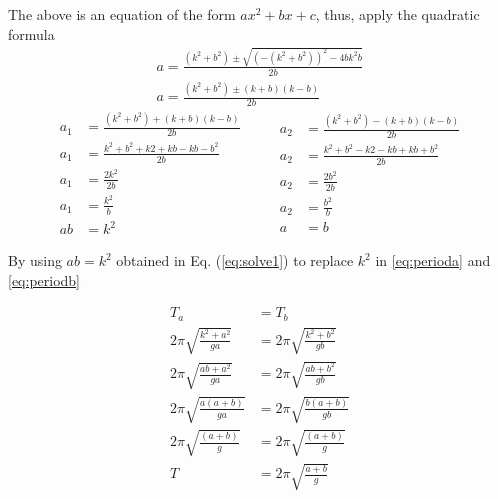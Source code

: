 \documentclass[12pt]{article}
\begin{document}
The above is an equation of the form $ax^2+bx+c$, thus, apply the quadratic formula
\begin{gather*}
    a= \frac{\left(k^2+b^2\right)\pm \sqrt{\left(-\left(k^2+b^2\right)\right)^2-4bk^2b}}{2b}\\
    a= \frac{\left(k^2+b^2\right)\pm \left(k+b\right)\left(k-b\right)}{ 2b }
\end{gather*}
\begin{equation}
    \begin{split}
        a_1 &= \frac{ (k^2+b^2)+ (k+b)(k-b) }{2b}\\
        a_1 &= \frac{ k^2+b^2+k2+kb-kb-b^2 }{2b} \\
        a_1 &= \frac{2k^2}{2b}\\
        a_1 &= \frac{k^2}{b}\\
        ab &= k^2 \label{eq:solve1} 
    \end{split}
    \qquad
    \begin{split}
        a_2 &= \frac{ (k^2+b^2)- (k+b)(k-b) }{ 2b } \\
        a_2 &= \frac{ k^2+b^2-k2-kb+kb+b^2 }{ 2b }   \\
        a_2 &= \frac{ 2b^2} { 2b }                    \\
        a_2 &= \frac{b^2}{ b }                      \\
        a &=b                          
    \end{split}
\end{equation}

By using $ab=k^2$ obtained in Eq. (\ref{eq:solve1}) to replace $k^2$ in \ref{eq:perioda} and \ref{eq:periodb} 

\begin{equation}
    \begin{aligned}
        T_a&=T_b \\
        2\pi \sqrt{\frac{k^2+a^2}{ga}} &=2\pi \sqrt{\frac{k^2+b^2}{gb}} \\
        2\pi \sqrt{\frac{ab+a^2}{ga}} &=2\pi \sqrt{\frac{ab+b^2}{gb}} \\
        2\pi \sqrt{\frac{a\left(a+b\right)}{ga}} &=2\pi \sqrt{\frac{b\left(a+b\right)}{gb}} \\
        2\pi \sqrt{\frac{\left(a+b\right)}{g}} &=2\pi \sqrt{\frac{\left(a+b\right)}{g}} \\
        T&=2\pi \sqrt{\frac{a+b}{ g }} \label{eq:periodab}
    \end{aligned}
\end{equation}
\end{document}
